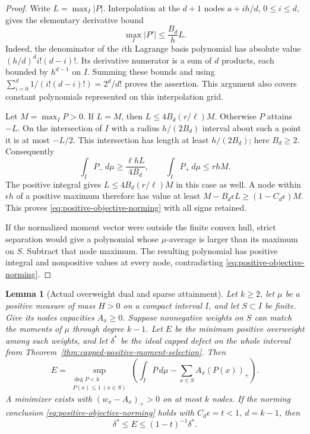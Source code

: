 \documentclass[11pt]{article}
\newtheorem{lemma}[theorem]{Lemma}
\theoremstyle{definition}
\begin{document}
\begin{proof}
Write $L=\max_I|P|$. Interpolation at the $d+1$ nodes
$a+ih/d$, $0\le i\le d$, gives the elementary derivative bound
\[
 \max_I|P'|\le \frac{B_d}{h}L.
\]
Indeed, the denominator of the $i$th Lagrange basis polynomial
has absolute value $(h/d)^d i!(d-i)!$. Its derivative numerator
is a sum of $d$ products, each bounded by $h^{d-1}$ on $I$.
Summing these bounds and using
$\sum_{i=0}^d1/(i!(d-i)!)=2^d/d!$ proves the assertion.
This argument also covers constant polynomials represented
on this interpolation grid.

Let $M=\max_I P>0$. If $L=M$, then $L\le4B_d(r/\ell)M$.
Otherwise $P$ attains $-L$. On the intersection of $I$ with a
radius $h/(2B_d)$ interval about such a point it is at most
$-L/2$. This intersection has length at least $h/(2B_d)$;
here $B_d\ge2$. Consequently
\[
 \int_I P_-\,d\mu\ge\frac{\ell hL}{4B_d},
 \qquad
 \int_I P_+\,d\mu\le rhM.
\]
The positive integral gives $L\le4B_d(r/\ell)M$ in this case
as well. A node within $\epsilon h$ of a positive maximum
therefore has value at least
$M-B_d\epsilon L\ge(1-C_d\epsilon)M$.
This proves \eqref{eq:positive-objective-norming} with all
signs retained.

If the normalized moment vector were outside the finite
convex hull, strict separation would give a polynomial whose
$\mu$-average is larger than its maximum on $S$. Subtract
that node maximum. The resulting polynomial has positive
integral and nonpositive values at every node, contradicting
\eqref{eq:positive-objective-norming}.
\end{proof}

\begin{lemma}[Actual overweight dual and sparse attainment]
\label{lem:actual-overweight-dual-sparse}
Let $k\ge2$, let $\mu$ be a positive measure of mass $H>0$
on a compact interval $I$, and let $S\subset I$ be finite.
Give its nodes capacities $A_x\ge0$. Suppose nonnegative
weights on $S$ can match the moments of $\mu$ through degree
$k-1$. Let $E$ be the minimum positive overweight among
such weights, and let $\delta^*$ be the ideal capped defect
on the whole interval from
Theorem~\ref{thm:capped-positive-moment-selection}. Then
\begin{equation}
 E=\sup_{\substack{\deg P<k\\P(x)\le1\ (x\in S)}}
       \left(\int_I P\,d\mu-\sum_{x\in S}A_x(P(x))_+\right).
 \label{eq:actual-overweight-polynomial-dual}
\end{equation}
A minimizer exists with $(w_x-A_x)_+>0$ on at most $k$
nodes. If the norming conclusion
\eqref{eq:positive-objective-norming} holds with
$C_d\epsilon=t<1$, $d=k-1$, then
\begin{equation}
 \delta^*\le E\le(1-t)^{-1}\delta^*.
 \label{eq:all-moment-actual-ideal-comparison}
\end{equation}
\end{lemma}
\end{document}
